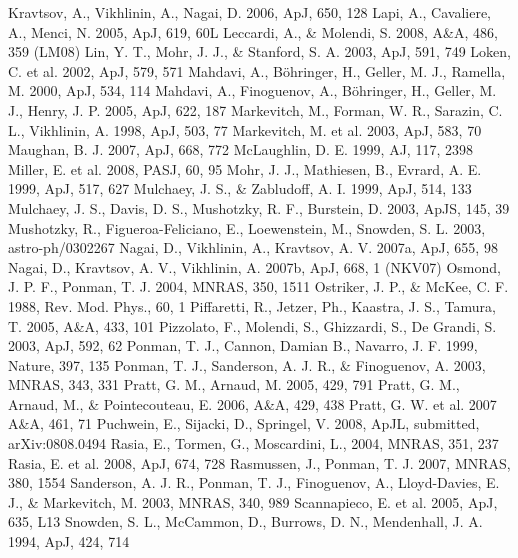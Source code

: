 \documentclass{aastex}
\begin{document}
\begin{references}
  Kravtsov, A., Vikhlinin, A., Nagai, D. 2006, ApJ, 650, 128
  Lapi, A., Cavaliere, A., Menci, N. 2005, ApJ, 619, 60L
  Leccardi, A., \& Molendi, S. 2008, A\&A, 486, 359 (LM08)
  Lin, Y. T., Mohr, J. J., \& Stanford, S. A. 2003, ApJ, 591, 749
  Loken, C. et al. 2002, ApJ, 579, 571
  Mahdavi, A., B\"{o}hringer, H., Geller, M. J., Ramella, M. 2000, ApJ, 534, 114
  Mahdavi, A., Finoguenov, A., B\"{o}hringer, H., Geller, M. J., Henry, J. P. 2005, ApJ, 622, 187
  Markevitch, M., Forman, W. R., Sarazin, C. L., Vikhlinin, A. 1998, ApJ, 503, 77
  Markevitch, M. et al. 2003, ApJ, 583, 70
  Maughan, B. J. 2007, ApJ, 668, 772
  McLaughlin, D. E. 1999, AJ, 117, 2398
  Miller, E. et al. 2008, PASJ, 60, 95
  Mohr, J. J., Mathiesen, B., Evrard, A. E. 1999, ApJ, 517, 627
  Mulchaey, J. S., \& Zabludoff, A. I. 1999, ApJ, 514, 133
  Mulchaey, J. S., Davis, D. S., Mushotzky, R. F., Burstein, D. 2003, ApJS, 145, 39
  Mushotzky, R., Figueroa-Feliciano, E., Loewenstein, M., Snowden, S. L. 2003, astro-ph/0302267
  Nagai, D., Vikhlinin, A., Kravtsov, A. V. 2007a, ApJ, 655, 98
  Nagai, D., Kravtsov, A. V., Vikhlinin, A. 2007b, ApJ, 668, 1 (NKV07)
  Osmond, J. P. F., Ponman, T. J. 2004, MNRAS, 350, 1511
  Ostriker, J. P., \& McKee, C. F. 1988, Rev. Mod. Phys., 60, 1
  Piffaretti, R., Jetzer, Ph., Kaastra, J. S., Tamura, T. 2005, A\&A, 433, 101
  Pizzolato, F., Molendi, S., Ghizzardi, S., De Grandi, S. 2003, ApJ, 592, 62
  Ponman, T. J., Cannon, Damian B., Navarro, J. F. 1999, Nature, 397, 135
  Ponman, T. J., Sanderson, A. J. R., \& Finoguenov, A. 2003, MNRAS, 343, 331
  Pratt, G. M., Arnaud, M. 2005, 429, 791
  Pratt, G. M., Arnaud, M., \& Pointecouteau, E. 2006, A\&A, 429, 438
  Pratt, G. W. et al. 2007 A\&A, 461, 71
  Puchwein, E., Sijacki, D., Springel, V. 2008, ApJL, submitted, arXiv:0808.0494
  Rasia, E., Tormen, G., Moscardini, L., 2004, MNRAS, 351, 237
  Rasia, E. et al. 2008, ApJ, 674, 728
  Rasmussen, J., Ponman, T. J. 2007, MNRAS, 380, 1554
  Sanderson, A. J. R., Ponman, T. J., Finoguenov, A., Lloyd-Davies, E. J., \& Markevitch, M. 2003, MNRAS, 340, 989
  Scannapieco, E. et al. 2005, ApJ, 635, L13
  Snowden, S. L., McCammon, D., Burrows, D. N., Mendenhall, J. A. 1994, ApJ, 424, 714

\end{references}
\end{document}
